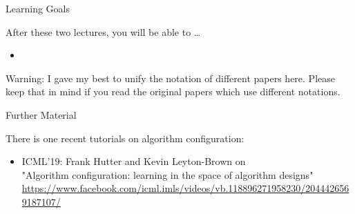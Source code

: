 \begin{frame}[c]{Learning Goals}

After these two lectures, you will be able to \ldots

\begin{itemize}
	\item 
\end{itemize}

\pause
\medskip
\alert{Warning:} I gave my best to \alert{unify the notation} of different papers here. Please keep that in mind if you read the original papers which use different notations.

\end{frame}
\begin{frame}[c]{Further Material}

There is one recent tutorials on algorithm configuration:

\begin{itemize}
	\item ICML'19: Frank Hutter and Kevin Leyton-Brown on\\
	"Algorithm configuration: learning in the space of algorithm designs"\\
	\footnotesize{\url{https://www.facebook.com/icml.imls/videos/vb.118896271958230/2044426569187107/}}
\end{itemize}


\end{frame}
